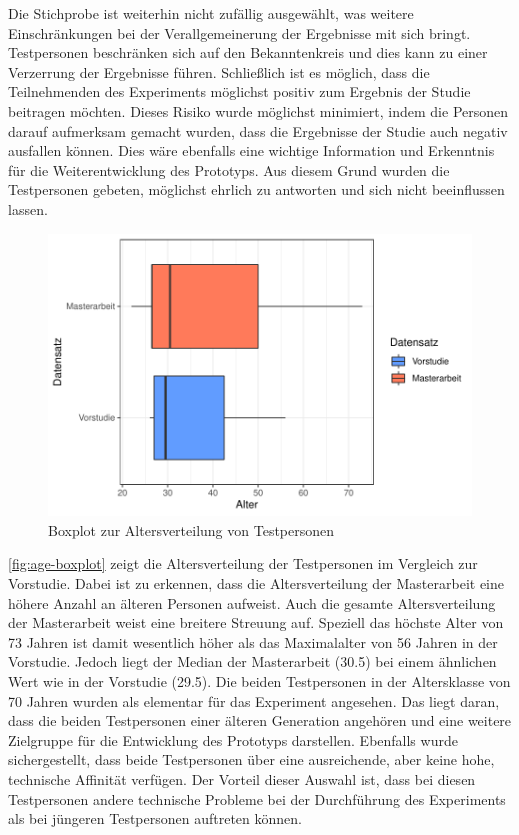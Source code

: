 Die Stichprobe ist weiterhin nicht zufällig ausgewählt, was weitere Einschränkungen bei der Verallgemeinerung der Ergebnisse mit sich bringt.
Testpersonen beschränken sich auf den Bekanntenkreis und dies kann zu einer Verzerrung der Ergebnisse führen.
Schließlich ist es möglich, dass die Teilnehmenden des Experiments möglichst positiv zum Ergebnis der Studie beitragen möchten.
Dieses Risiko wurde möglichst minimiert, indem die Personen darauf aufmerksam gemacht wurden, dass die Ergebnisse der Studie auch negativ ausfallen können.
Dies wäre ebenfalls eine wichtige Information und Erkenntnis für die Weiterentwicklung des Prototyps.
Aus diesem Grund wurden die Testpersonen gebeten, möglichst ehrlich zu antworten und sich nicht beeinflussen lassen.\\

\begin{figure}[!ht]
    \centering
    \includegraphics[width=1\columnwidth]{figures/boxplot.pdf}
    \caption{\label{fig:age-boxplot}Boxplot zur Altersverteilung von Testpersonen}
\end{figure}

\autoref{fig:age-boxplot} zeigt die Altersverteilung der Testpersonen im Vergleich zur Vorstudie.
Dabei ist zu erkennen, dass die Altersverteilung der Masterarbeit eine höhere Anzahl an älteren Personen aufweist.
Auch die gesamte Altersverteilung der Masterarbeit weist eine breitere Streuung auf.
Speziell das höchste Alter von 73 Jahren ist damit wesentlich höher als das Maximalalter von 56 Jahren in der Vorstudie.
Jedoch liegt der Median der Masterarbeit (30.5) bei einem ähnlichen Wert wie in der Vorstudie (29.5).
Die beiden Testpersonen in der Altersklasse von 70 Jahren wurden als elementar für das Experiment angesehen.
Das liegt daran, dass die beiden Testpersonen einer älteren Generation angehören und eine weitere Zielgruppe für die Entwicklung des Prototyps darstellen.
Ebenfalls wurde sichergestellt, dass beide Testpersonen über eine ausreichende, aber keine hohe, technische Affinität verfügen.
Der Vorteil dieser Auswahl ist, dass bei diesen Testpersonen andere technische Probleme bei der Durchführung des Experiments als bei jüngeren Testpersonen auftreten können.\\

